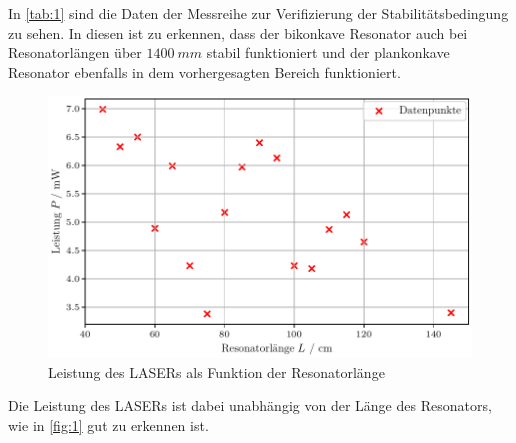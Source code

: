 \noindent
In \autoref{tab:1} sind die Daten der Messreihe zur Verifizierung der Stabilitätsbedingung zu sehen. In diesen ist zu erkennen, dass der bikonkave Resonator auch bei Resonatorlängen über $\SI{1400}{mm}$ stabil funktioniert und der plankonkave Resonator ebenfalls in dem vorhergesagten Bereich funktioniert.
\begin{figure}[H]
  \centering
  \includegraphics[width=0.65\linewidth]{plots/stab_bed_1.pdf}
  \caption{Leistung des LASERs als Funktion der Resonatorlänge}
  \label{fig:1}
\end{figure}
\noindent
Die Leistung des LASERs ist dabei unabhängig von der Länge des Resonators, wie in \autoref{fig:1} gut zu erkennen ist.
\newpage
